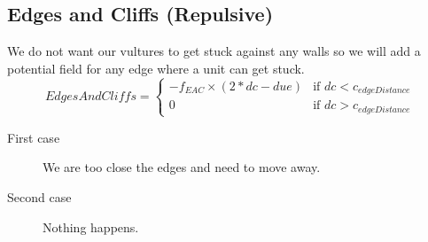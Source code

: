	\subsection{Edges and Cliffs (Repulsive)}
		We do not want our vultures to get stuck against any walls so we will add a potential field for any edge where a unit can get stuck.
		\begin{displaymath}
			EdgesAndCliffs = \begin{cases}
					-f_{EAC} \times {(2*dc - due)} & \text{if } dc < c_{edgeDistance}\\
					0 & \text{if } dc > c_{edgeDistance}
				\end{cases}		
		\end{displaymath}
	\begin{description}	
		\item[First case] We are too close the edges and need to move away.  
		\item[Second case] Nothing happens. 
    \end{description}
     

